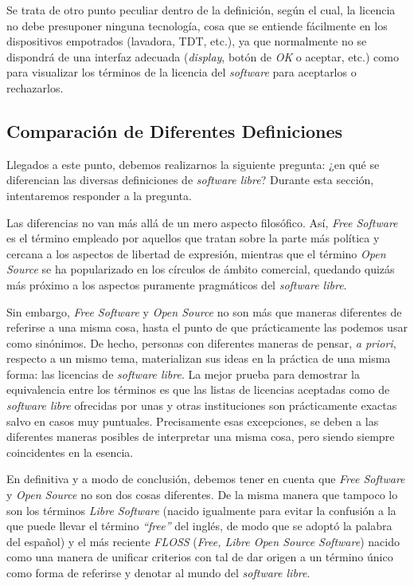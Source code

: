 Se trata de otro punto peculiar dentro de la definición, según el cual, la
licencia no debe presuponer ninguna tecnología, cosa que se entiende
fácilmente en los dispositivos empotrados (lavadora, TDT, etc.), ya que
normalmente no se dispondrá de una interfaz adecuada (\textit{display}, botón de
\textit{OK} o aceptar, etc.) como para visualizar los términos de la licencia
del \textit{software} para aceptarlos o rechazarlos.

\subsection{Comparación de Diferentes Definiciones}

Llegados a este punto, debemos realizarnos la siguiente pregunta: ¿en qué se
diferencian las diversas definiciones de \textit{software libre}? Durante esta
sección, intentaremos responder a la pregunta.

Las diferencias no van más allá de un mero aspecto filosófico. Así, \textit{Free
Software} es el término empleado por aquellos que tratan sobre la parte más
política y cercana a los aspectos de libertad de expresión, mientras que el
término \textit{Open Source} se ha popularizado en los círculos de ámbito
comercial, quedando quizás más próximo a los aspectos puramente pragmáticos del
\textit{software libre}.

Sin embargo, \textit{Free Software} y \textit{Open Source} no son más que
maneras diferentes de referirse a una misma cosa, hasta el punto de que
prácticamente las podemos usar como sinónimos. De hecho, personas con diferentes
maneras de pensar, \textit{a priori}, respecto a un mismo tema, materializan sus
ideas en la práctica de una misma forma: las licencias de \textit{software
libre}. La mejor prueba para demostrar la equivalencia entre los términos es
que las listas de licencias aceptadas como de \textit{software libre} ofrecidas
por unas y otras instituciones son prácticamente exactas salvo en casos muy
puntuales. Precisamente esas excepciones, se deben a las diferentes maneras
posibles de interpretar una misma cosa, pero siendo siempre coincidentes en la
esencia.

En definitiva y a modo de conclusión, debemos tener en cuenta que \textit{Free
Software} y \textit{Open Source} no son dos cosas diferentes. De la misma manera
que tampoco lo son los términos \textit{Libre Software} (nacido igualmente para
evitar la confusión a la que puede llevar el término \textit{``free''} del
inglés, de modo que se adoptó la palabra del español) y el más reciente
\textit{FLOSS} (\textit{Free, Libre Open Source Software}) nacido como una
manera de unificar criterios con tal de dar origen a un término único como
forma de referirse y denotar al mundo del \textit{software libre}.

